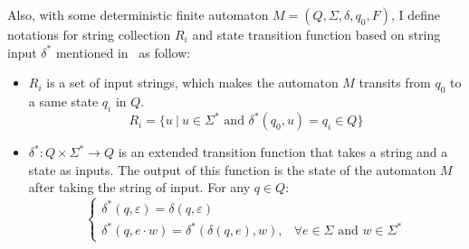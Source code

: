 \documentclass[a4paper,12pt]{article}
\begin{document}
\noindent 
Also, with some deterministic finite automaton $M=(Q,\Sigma,\delta,q_{0},F)$, I define notations for string collection $R_{i}$ and state transition function based on string input $\delta^{*}$ mentioned in~\cite{lec2} as follow:
\begin{itemize}
        \setlength{\parskip}{0em}
    \item $R_{i}$ is a set of input strings, which makes the automaton $M$ transits from $q_{0}$ to a same state $q_{i}$ in $Q$. 
        \begin{equation} \label{eq:r}
        R_{i} = \{ u\ |\ u \in \Sigma^{*}\mbox{ and }\delta^{*}(q_{0}, u) = q_{i} \in Q \} 
    \end{equation}
    \item $\delta^{*}: Q \times \Sigma^{*} \rightarrow Q$ is an extended transition function that takes a string and a state as inputs. The output of this function is the state of the automaton $M$ after taking the string of input. For any $q \in Q$: 
$$\begin{cases}
    \delta^{*}(q,\varepsilon) = \delta(q,\varepsilon) &  \\
    \delta^{*}(q,e\cdot w) = \delta^{*}(\delta(q,e),w), & \forall e \in \Sigma \mbox{ and } w \in \Sigma^{*}
\end{cases}$$   
\end{itemize}
\vspace{1em}
\end{document}
